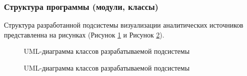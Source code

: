 \documentclass[a4paper]{extarticle}
\numberwithin{equation}{section}
\begin{document}
\subsubsection{Структура программы (модули, классы)}
Структура разработанной подсистемы визуализации аналитических источников представленна на рисунках (Рисунок \ref{umlClassDiagram:ris1} и Рисунок \ref{umlClassDiagram:ris2}).
\begin{figure}[H]
\caption{UML-диаграмма классов разрабатываемой подсистемы}
\label{umlClassDiagram:ris1}
\end{figure}\par
\begin{figure}[H]
\caption{UML-диаграмма классов разрабатываемой подсистемы}
\label{umlClassDiagram:ris2}
\end{figure}\par
\end{document}
